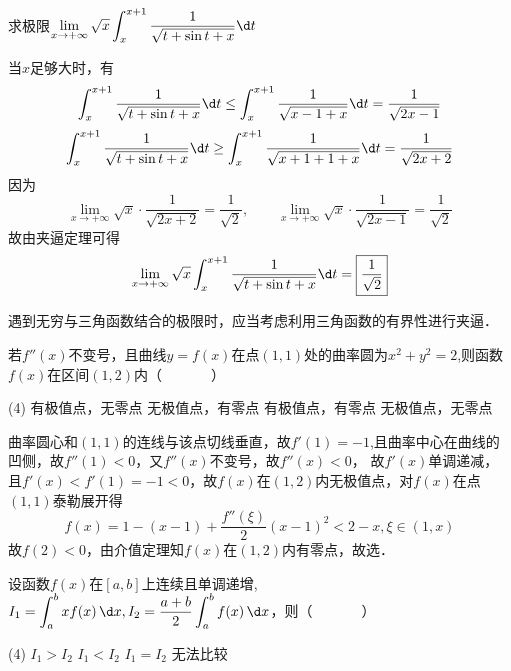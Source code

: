 \documentclass[12pt, a4paper, oneside, UTF8]{ctexbook}
\begin{document}
\begin{exercise}
    求极限$\lim\limits_{x \to +\infty} \sqrt{x}\displaystyle\int_{x}^{x+1} \dfrac{1}{\sqrt{t+\sin t +x}} \d t$
\end{exercise}
\begin{solution}
    当$x$足够大时，有
    \[\int_{x}^{x+1} \dfrac{1}{\sqrt{t+\sin t +x}} \d t
    \le \int_{x}^{x+1} \dfrac{1}{\sqrt{x -1 + x}} \d t
    =\dfrac{1}{\sqrt{2x -1}}\]
    \[\int_{x}^{x+1} \dfrac{1}{\sqrt{t+\sin t +x}} \d t
    \ge \int_{x}^{x+1} \dfrac{1}{\sqrt{x + 1 + 1 + x}} \d t
    =\dfrac{1}{\sqrt{2x + 2}}\]
    因为
    \[\lim\limits_{x \to +\infty} \sqrt{x} \cdot \dfrac{1}{\sqrt{2x + 2}} = \dfrac{1}{\sqrt{2}}
    ,\qquad 
    \lim\limits_{x \to +\infty} \sqrt{x} \cdot \dfrac{1}{\sqrt{2x - 1}} = \dfrac{1}{\sqrt{2}}
    \]
    故由夹逼定理可得
    \[\lim\limits_{x \to +\infty} \sqrt{x}\displaystyle\int_{x}^{x+1} \dfrac{1}{\sqrt{t+\sin t +x}} \d t = \boxed{\dfrac{1}{\sqrt{2}}}\]
\end{solution}
\begin{myRemark}
    遇到无穷与三角函数结合的极限时，应当考虑利用三角函数的有界性进行夹逼．
\end{myRemark}
\begin{exercise}
    若$f''(x)$不变号，且曲线$y=f(x)$在点$(1,1)$处的曲率圆为$x^2 + y^2 = 2$,则函数$f(x)$在区间$(1,2)$内（~~~~~~~）
    \begin{tasks}[style = itemize, label=\Alph*.](4)
        \task 有极值点，无零点
        \task 无极值点，有零点
        \task 有极值点，有零点
        \task 无极值点，无零点
    \end{tasks}
\end{exercise}
\begin{solution}
    曲率圆心和$(1,1)$的连线与该点切线垂直，故$f'(1)=-1$,且曲率中心在曲线的凹侧，故$f''(1)<0$，又$f''(x)$不变号，故$f''(x)<0$，
    故$f'(x)$单调递减，且$f'(x)<f'(1)=-1<0$，故$f(x)$在$(1,2)$内无极值点，对$f(x)$在点$(1,1)$泰勒展开得
    \[f(x)=1 - (x-1) + \dfrac{f''(\xi)}{2}(x-1)^2 < 2 - x , \xi \in (1,x)\]
    故$f(2)<0$，由介值定理知$f(x)$在$(1,2)$内有零点，故选．
\end{solution}
\begin{exercise}
    设函数$f(x)$在$[a,b]$上连续且单调递增,$I_1=\displaystyle\int_{a}^{b} xf(x)\,\d x , I_2=\frac{a+b}{2}\int_a^bf(x)\,\d x$，则（~~~~~~~）
    \begin{tasks}[style = itemize, label=\Alph*.](4)
        \task $I_1 > I_2$
        \task $I_1 < I_2$
        \task $I_1 = I_2$
        \task 无法比较
    \end{tasks}
\end{exercise}
\end{document}

